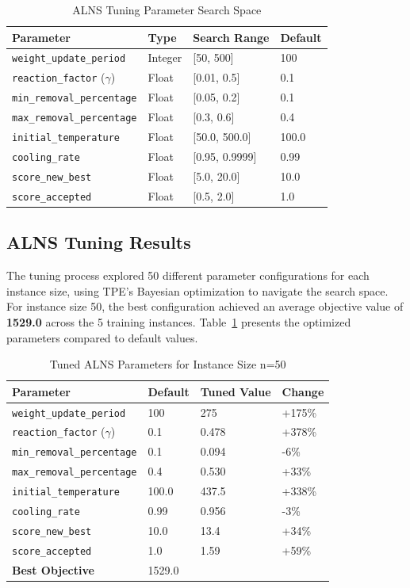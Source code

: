 \documentclass[a4paper]{scrartcl}
\begin{document}
\begin{table}[H]
\centering
\caption{ALNS Tuning Parameter Search Space}
\begin{tabular}{l l l l}
\toprule
Parameter & Type & Search Range & Default \\
\midrule
\texttt{weight\_update\_period} & Integer & [50, 500] & 100 \\
\texttt{reaction\_factor} ($\gamma$) & Float & [0.01, 0.5] & 0.1 \\
\texttt{min\_removal\_percentage} & Float & [0.05, 0.2] & 0.1 \\
\texttt{max\_removal\_percentage} & Float & [0.3, 0.6] & 0.4 \\
\texttt{initial\_temperature} & Float & [50.0, 500.0] & 100.0 \\
\texttt{cooling\_rate} & Float & [0.95, 0.9999] & 0.99 \\
\texttt{score\_new\_best} & Float & [5.0, 20.0] & 10.0 \\
\texttt{score\_accepted} & Float & [0.5, 2.0] & 1.0 \\
\bottomrule
\end{tabular}
\end{table}

\subsection{ALNS Tuning Results}
\label{subsec:alns_tuning_results}

The tuning process explored 50 different parameter configurations for each instance size, using TPE's Bayesian
optimization to navigate the search space.
For instance size 50, the best configuration achieved an average objective value of \textbf{1529.0} across the 5 training instances.
Table~\ref{tab:tuned_params_n50} presents the optimized parameters compared to default values.

\begin{table}[H]
\centering
\caption{Tuned ALNS Parameters for Instance Size n=50}
\label{tab:tuned_params_n50}
\begin{tabular}{l l l l}
\toprule
Parameter & Default & Tuned Value & Change \\
\midrule
\texttt{weight\_update\_period} & 100 & 275 & +175\% \\
\texttt{reaction\_factor} ($\gamma$) & 0.1 & 0.478 & +378\% \\
\texttt{min\_removal\_percentage} & 0.1 & 0.094 & -6\% \\
\texttt{max\_removal\_percentage} & 0.4 & 0.530 & +33\% \\
\texttt{initial\_temperature} & 100.0 & 437.5 & +338\% \\
\texttt{cooling\_rate} & 0.99 & 0.956 & -3\% \\
\texttt{score\_new\_best} & 10.0 & 13.4 & +34\% \\
\texttt{score\_accepted} & 1.0 & 1.59 & +59\% \\
\midrule
\textbf{Best Objective} & \multicolumn{3}{l}{1529.0} \\
\bottomrule
\end{tabular}
\end{table}
\end{document}
